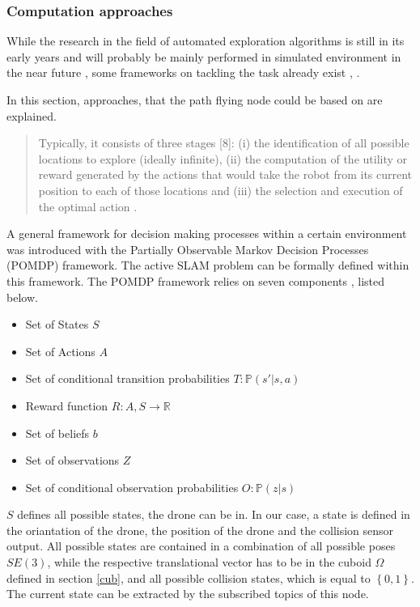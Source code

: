 	\subsubsection{Computation approaches}
	
	While the research in the field of automated exploration algorithms is still in its early years \cite{early} and will probably be mainly performed 
	in simulated environment in the near future \cite{deep}, some frameworks on tackling the 
	task already exist \cite{early}, \cite{deep} \cite{accurat} \cite{lopez}. 
	
	In this section, approaches, that the path flying node could be based on are explained. 
	
	\begin{quote}
	Typically, it consists of three stages [8]: (i) the identification of all possible locations
to explore (ideally infinite), (ii) the computation of the utility or reward generated by the actions that
would take the robot from its current position to each of those locations and (iii) the selection and
execution of the optimal action \cite{deep}. 
\end{quote}

A general framework for decision making processes within a certain environment was introduced with the Partially Observable Markov Decision Processes (POMDP) framework. 
	The active SLAM problem can be formally defined within this framework. 
	The POMDP framework relies on seven components \cite{vander}, listed below. 
	
	\begin{itemize}
	\item{Set of States $S$}
	\item{Set of Actions $A$}
	\item{Set of conditional transition probabilities $T: \mathbb{P}(s'|s, a)$}
	\item{Reward function $R : A, S \rightarrow \mathbb{R}$}
	\item{Set of beliefs $b$}
	\item{Set of observations $Z$}
	\item{Set of conditional observation probabilities $O: \mathbb{P}(z|s)$}
	\end{itemize}
	
	$S$ defines all possible states, the drone can be in. In our case, a state is defined in the oriantation of the drone, the position of the drone and the collision sensor output.
	All possible states are contained in a combination of all possible poses $SE(3)$, while the respective translational vector has to be in the cuboid $\Omega$ defined in section \ref{cub},  
	and all possible collision states, which is equal to $\left\{0,1\right\}$. The current state can be extracted by the subscribed topics of this node. 
	
